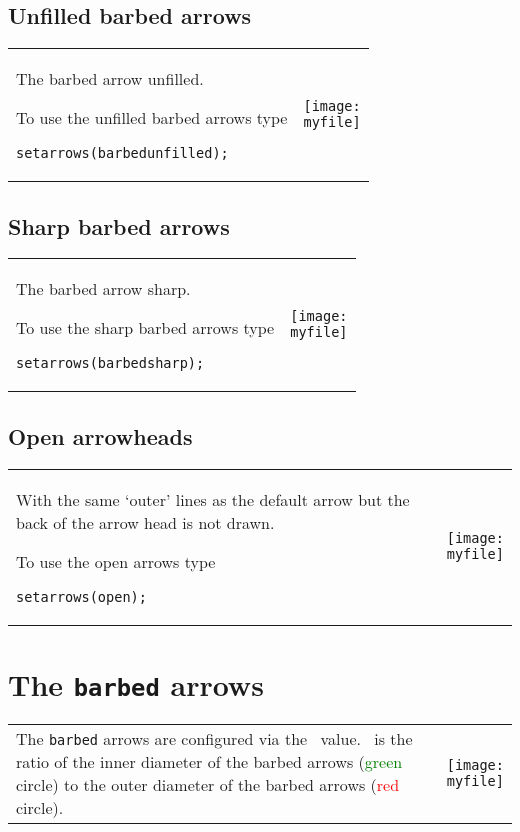 \documentclass[paper=a4,11pt,UKenglish,DIV=calc,BCOR=0mm,parskip=half,fleqn]{scrartcl}
\makeatletter
\newenvironment{example}[1]{%
  \def\myfile{#1}
  \begin{tabular}{@{}p{.67\linewidth-\tabcolsep}p{.33\linewidth}@{}}
    \begin{minipage}[c]{\linewidth}}{%
    \end{minipage}
    &\parbox[c]{\linewidth}{\centering\texttt{[image: \\myfile]}}
  \end{tabular}}
\makeatother
\begin{document}
\subsection{Unfilled barbed arrows}
\label{sec:unfill-barb-arrows}

\begin{example}{mparrowsexamples5.mps}
  The barbed arrow unfilled.

  To use the unfilled barbed arrows type
\begin{lstlisting}
setarrows(barbedunfilled);
\end{lstlisting}
\end{example}

\subsection{Sharp barbed arrows}
\label{sec:sharp-barbed-arrows}

\begin{example}{mparrowsexamples6.mps}
  The barbed arrow sharp.

  To use the sharp barbed arrows type
\begin{lstlisting}
setarrows(barbedsharp);
\end{lstlisting}
\end{example}

\subsection{Open arrowheads}
\label{sec:open-arrowheads}

\begin{example}{mparrowsexamples7.mps}
  With the same `outer' lines as the default arrow but the back of the
  arrow head is not drawn.

  To use the open arrows type
\begin{lstlisting}
setarrows(open);
\end{lstlisting}
\end{example}

\section{The \texttt{barbed} arrows}
\label{sec:barbed-arrows}

\begin{example}{mparrowsexamples33.mps}
  The \texttt{barbed} arrows are configured via the
  \barbedarrowindent\ value. \barbedarrowindent\ is the ratio of the
  inner diameter of the barbed arrows (\textcolor{green}{green}
  circle) to the outer diameter of the barbed arrows
  (\textcolor{red}{red} circle).
\end{example}
\end{document}
